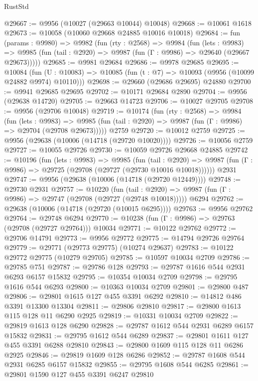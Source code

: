 \begin{lexlean}{RustStd}
\begin{coremodule}
@29667 := @9956 (@10027 (@29663 @10044) @10048)
@29668 := @10061 @1618
@29673 := @10058 (@10060 @29668 @24885 @10016 @10018)
@29684 := fun (params : @9980) =>
  @9982
    (fun (rty : @2568) =>
    @9984
      (fun (lets : @9983) =>
      @9985 (fun (tail : @2920) => @9987 (fun (Γ : @9986) => @29640 (@29667 @29673)))))
@29685 := @9981 @29684
@29686 := @9978 @29685
@29695 := @10084
    (fun (U : @10083) => @10085 (fun (t : @7) => @10093 (@9956 (@10099 @24882 @9974) @10110)))
@29698 := @29660 (@29686 @29695) @24880
@29700 := @9941 @29685 @29695
@29702 := @10171 @29684 @2890
@29704 := @9956 (@29638 @14720)
@29705 := @29663 @14723
@29706 := @10027 @29705
@29708 := @9956 (@29706 @10048)
@29719 := @10174
    (fun (rty : @2568) =>
    @9984
      (fun (lets : @9983) =>
      @9985 (fun (tail : @2920) => @9987 (fun (Γ : @9986) => @29704 (@29708 @29673)))))
    @2759
@29720 := @10012 @2759
@29725 := @9956 (@29638 (@10006 (@14718 (@29720 @10020))))
@29726 := @10056 @2759
@29727 := @10055 @29726
@29730 := @10059 @29726 @29668 @24885
@29742 := @10196
    (fun (lets : @9983) =>
    @9985
      (fun (tail : @2920) =>
      @9987 (fun (Γ : @9986) => @29725 (@29708 (@29727 (@29730 @10016 @10018))))))
    @2931
@29747 := @9956 (@29638 (@10006 (@14718 (@29720 @12449))))
@29748 := @29730 @2931
@29757 := @10220
    (fun (tail : @2920) => @9987 (fun (Γ : @9986) => @29747 (@29708 (@29727 (@29748 @10018)))))
    @6294
@29762 := @29638 (@10006 (@14718 (@29720 (@10015 @6295))))
@29763 := @9956 @29762
@29764 := @29748 @6294
@29770 := @10238 (fun (Γ : @9986) => @29763 (@29708 (@29727 @29764))) @10034
@29771 := @10122 @29762
@29772 := @29706 @14791
@29773 := @9956 @29772
@29775 := @14794 @29726 @29764
@29779 := @29771 (@29773 @29775) (@10274 @29637)
@29783 := @10122 @29772 @29775 (@10279 @29705)
@29785 := @10597 @10034 @2709
@29786 := @29785 @751
@29787 := @29786 @128
@29793 := @29787 @1616 @544 @2931 @6293 @6157 @15832
@29795 := @10354 @10034 @2709
@29798 := @29795 @1616 @544 @6293
@29800 := @10363 @10034 @2709
@29801 := @29800 @487
@29806 := @29801 @1615 @127 @455 @3391 @6292
@29810 := @14812 @486 @3391 @13300 @13304
@29811 := @29806 @29810
@29817 := @29800 @1613 @115 @128 @11 @6290 @2925
@29819 := @10331 @10034 @2709
@29822 := @29819 @1613 @128 @6290
@29828 := @29787 @1612 @544 @2931 @6289 @6157 @15832
@29831 := @29795 @1612 @544 @6289
@29837 := @29801 @1611 @127 @455 @3391 @6288 @29810
@29843 := @29800 @1609 @115 @128 @11 @6286 @2925
@29846 := @29819 @1609 @128 @6286
@29852 := @29787 @1608 @544 @2931 @6285 @6157 @15832
@29855 := @29795 @1608 @544 @6285
@29861 := @29801 @1590 @127 @455 @3391 @6247 @29810

\end{coremodule}
\end{lexlean}
